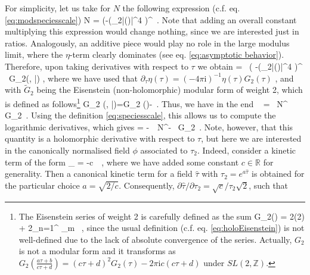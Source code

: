 For simplicity, let us take for $N$ the following expression (c.f. eq. \eqref{eq:modspeciesscale})
%
\beq
	 N = \left(-\log(\tau_2|\eta(\tau)|^4 \right)^\gamma\, .
\eeq
%
Note that adding an overall constant multiplying this expression would change nothing, since we are interested just in ratios. Analogously, an additive piece would play no role in the large modulus limit, where the $\eta$-term clearly dominates (see eq. \eqref{eq:asymptotic behavior}). Therefore, upon taking derivatives with respect to $\tau$ we obtain
%
\beq
	 =  \,  \left( -\log(\tau_2|\eta(\tau)|^4 \right)^{} \,  {\tilde G}_2(\tau, \bar\tau) , 
\eeq
where we have used that $\partial_{\tau}\eta(\tau)=\left(-4\pi \text{i}\right)^{-1}\eta(\tau)G_2(\tau)$ \cite{Cvetic:1991qm}, and with ${\tilde G}_2$ being the Eisenstein (non-holomorphic) modular form of weight 2, which is defined as follows\footnote{\label{fnote:Eisenstein}The Eisenstein series of weight 2 is carefully defined as the sum
\beq
G_{2}(\tau) = 2\zeta(2) + 2\sum_{n=1}^{\infty} \sum_{m \in {}} \, ,
\eeq since the usual definition (c.f. eq. \eqref{eq:holoEisenstein}) is not well-defined due to the lack of absolute convergence of the series. Actually, $G_2$ is not a modular form and it transforms as $G_2 \left(\frac{a \tau +b}{c\tau +d} \right)= \left( c\tau +d \right)^{2} G_{2}(\tau) -2 \pi \text{i} c \left( c\tau +d \right)$ under $SL(2, \mathbb{Z})$.} 
%
\beq\label{eq:nonholoG2}
	{\tilde G}_2 (\tau, \bar \tau)=G_2 (\tau)-\, .
\eeq
%
Thus, we have in the end
%
\beq
	\ %
 =\  N^{}\, {\tilde G}_2\, .
\eeq
%
Using the definition \eqref{eq:speciesscale}, this allows us to compute  the logarithmic derivatives, which gives
%
\beq
	 \frac {\partial \LQG}{\partial \tau} = %
 -\, \ N^{-} \ {\tilde G}_2\, .
\eeq
%
Note, however, that this quantity is a holomorphic derivative with respect to $\tau$, but here we are interested in the canonically normalised field $\phi$ associated to $\tau_2$. Indeed, consider a kinetic term of the form
%
\beq \label{eq:lagrangianII}
	_{} =  -c\, \, ,
\eeq
%
where we have added some constant $c \in \mathbb{R}$ for generality. Then a canonical kinetic term for a field $\hat{\tau}$ with $\tau_2=e^{a\hat{\tau}}$ is obtained for the particular choice $a=\sqrt{2/c}$. Consequently, $\partial \hat{\tau} /\partial \tau_2 = \sqrt{c}/\tau_2 \sqrt{2}$, such that
